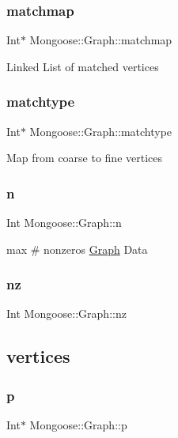 \subsubsection{\texorpdfstring{matchmap}{matchmap}}
{\footnotesize\ttfamily Int$\ast$ Mongoose\+::\+Graph\+::matchmap}

Linked List of matched vertices \hypertarget{class_mongoose_1_1_graph_a5d445d5006d859ea6587b3dd55d948e1}{}\label{class_mongoose_1_1_graph_a5d445d5006d859ea6587b3dd55d948e1} 
\subsubsection{\texorpdfstring{matchtype}{matchtype}}
{\footnotesize\ttfamily Int$\ast$ Mongoose\+::\+Graph\+::matchtype}

Map from coarse to fine vertices \hypertarget{class_mongoose_1_1_graph_a93aec4ec3102b46598f64438e19e1867}{}\label{class_mongoose_1_1_graph_a93aec4ec3102b46598f64438e19e1867} 
\subsubsection{\texorpdfstring{n}{n}}
{\footnotesize\ttfamily Int Mongoose\+::\+Graph\+::n}

max \# nonzeros \hyperlink{class_mongoose_1_1_graph}{Graph} Data \hypertarget{class_mongoose_1_1_graph_a4b715d25936070308d6b1286216dc3d7}{}\label{class_mongoose_1_1_graph_a4b715d25936070308d6b1286216dc3d7} 
\subsubsection{\texorpdfstring{nz}{nz}}
{\footnotesize\ttfamily Int Mongoose\+::\+Graph\+::nz}

\subsection*{vertices}\hypertarget{class_mongoose_1_1_graph_a0f76998b739e6c44db3573714958b849}{}\label{class_mongoose_1_1_graph_a0f76998b739e6c44db3573714958b849} 
\subsubsection{\texorpdfstring{p}{p}}
{\footnotesize\ttfamily Int$\ast$ Mongoose\+::\+Graph\+::p}

